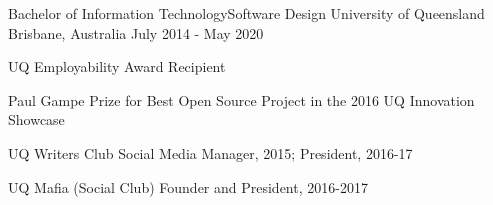 


\begin{cventries}


\cventry
{Bachelor of Information Technology{\enskip\cdotp\enskip}Software Design} %
{University of Queensland} %
{Brisbane, Australia} %
{July 2014 - May 2020} %
{ %
\begin{cvitems}
\item {UQ Employability Award Recipient}
\item {Paul Gampe Prize for Best Open Source Project in the 2016 UQ Innovation Showcase}
\item {UQ Writers Club Social Media Manager, 2015; President, 2016-17}
\item {UQ Mafia (Social Club) Founder and President, 2016-2017}
\end{cvitems}
}


\end{cventries}
